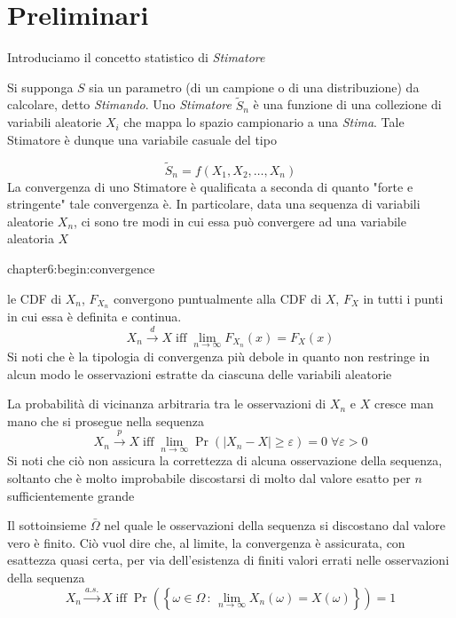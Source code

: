 \section{Preliminari}
Introduciamo il concetto statistico di \textit{Stimatore}
\begin{definitionS}
	Si supponga $S$ sia un parametro (di un campione o di una distribuzione) da calcolare, detto \textit{Stimando}. Uno \textit{Stimatore} 
	$\tilde{S}_n$ \`e una funzione di una collezione di variabili aleatorie $X_i$ che mappa lo spazio campionario a una \textit{Stima}. Tale Stimatore
	\`e dunque una variabile casuale del tipo
\end{definitionS}
\begin{equation}
	\tilde{S}_n = f(X_1,X_2,\ldots,X_n)
\end{equation}
La convergenza di uno Stimatore \`e qualificata a seconda di quanto "forte e stringente" tale convergenza \`e. In particolare, data una sequenza di 
variabili aleatorie $X_n$, ci sono tre modi in cui essa pu\`o convergere ad una variabile aleatoria $X$
\begin{altDescription}{chapter6:begin:convergence}
	\item[Convergenza in Distribuzione] le CDF di $X_n$, $F_{X_n}$ convergono puntualmente alla CDF di $X$, $F_X$ in tutti i punti in 
		cui essa \`e definita e continua.
		\begin{equation}
			X_n\stackrel{d}{\rightarrow}X\;\mathrm{iff}\;\lim_{n\to\infty}F_{X_n}(x)=F_X(x)
		\end{equation}
		Si noti che \`e la tipologia di convergenza pi\`u debole in quanto non restringe in alcun modo le osservazioni estratte da ciascuna delle 
		variabili aleatorie
	\item[Convergenza in Probabilit\`a] La probabilit\`a di vicinanza arbitraria tra le osservazioni di $X_n$ e $X$ cresce man mano che si prosegue
		nella sequenza
		\begin{equation}
			X_n\stackrel{p}{\rightarrow}X\;\mathrm{iff}\;\lim_{n\to\infty}\Pr(|X_n-X|\geq\varepsilon)=0\;\forall\varepsilon>0
		\end{equation}
		Si noti che ci\`o non assicura la correttezza di alcuna osservazione della sequenza, soltanto che \`e molto improbabile discostarsi di molto 
		dal valore esatto per $n$ sufficientemente grande
	\item[Convergenza Quasi Certa] Il sottoinsieme $\bar{\Omega}$ nel quale le osservazioni della sequenza si discostano dal valore vero \`e finito.
		Ci\`o vuol dire che, al limite, la convergenza \`e assicurata, con esattezza quasi certa, per via dell'esistenza di finiti valori errati nelle
		osservazioni della sequenza
		\begin{equation}
			X_n\stackrel{a.s.}{\rightarrow}X\;\mathrm{iff}\;\Pr\left(\left\{\omega\in\Omega\,:\,\lim_{n\to\infty}X_n(\omega)=X(\omega)\right\}\right)=1	
		\end{equation}
\end{altDescription}
